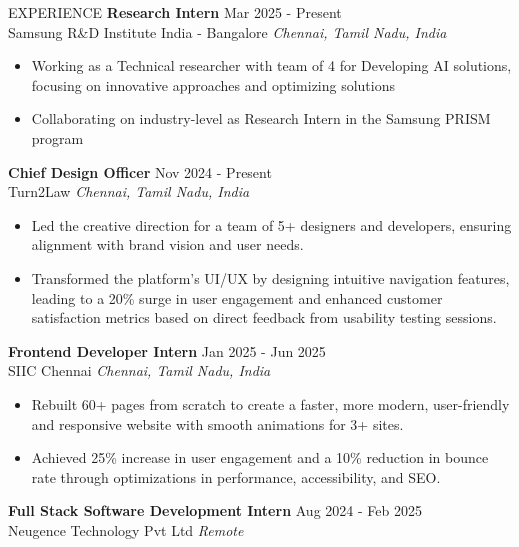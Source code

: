 \documentclass{resume} %
\begin{document}






\begin{rSection}{EXPERIENCE}
    \textbf{Research Intern} \hfill Mar 2025 - Present\\
Samsung R\&D Institute India - Bangalore \hfill \textit{Chennai, Tamil Nadu, India}



\begin{itemize}
\itemsep -3pt{}
\item Working as a Technical researcher with team of 4 for Developing AI solutions, focusing on innovative approaches and optimizing solutions
\item Collaborating on industry-level as Research Intern in the Samsung PRISM program
\end{itemize}
\textbf{Chief Design Officer} \hfill Nov 2024 - Present\\
Turn2Law \hfill \textit{Chennai, Tamil Nadu, India}



\begin{itemize}
\itemsep -3pt{}
\item Led the creative direction for a team of 5+ designers and developers, ensuring alignment with brand vision and user needs.
\item Transformed the platform’s UI/UX by designing intuitive navigation features, leading to a 20\% surge in user engagement and enhanced customer satisfaction metrics based on direct feedback from usability testing sessions.
\end{itemize}
\textbf{Frontend Developer Intern} \hfill Jan 2025 - Jun 2025\\
SIIC Chennai \hfill \textit{Chennai, Tamil Nadu, India}



\begin{itemize}
\itemsep -3pt{}
\item Rebuilt 60+ pages from scratch to create a faster, more modern, user-friendly and responsive website with smooth animations for 3+ sites.
\item Achieved 25\% increase in user engagement and a 10\% reduction in bounce rate through optimizations in performance, accessibility, and SEO.
\end{itemize}
\textbf{Full Stack Software Development Intern} \hfill Aug 2024 - Feb 2025\\
Neugence Technology Pvt Ltd \hfill \textit{Remote}




\end{rSection}
\end{document}
